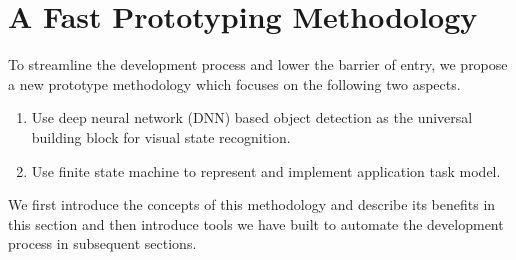 



\section{A Fast Prototyping Methodology}

To streamline the development process and lower the barrier of entry, we propose
a new prototype methodology which focuses on the following two aspects.
\begin{enumerate}
  \item  Use deep neural network (DNN) based object detection as the universal
        building block for visual state recognition.
  \item Use finite state machine to represent and implement application task model.
\end{enumerate}
We first introduce the concepts of this methodology and describe its benefits in
this section and then introduce tools we have built to automate the development
process in subsequent sections.

